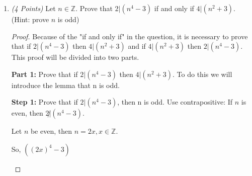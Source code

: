 \documentclass[10pt]{article} %
\newcommand{\Z}{\mathbb{Z}}
\newcommand{\points}[1]{{\it (#1 Points)}}
\begin{document}
\begin{enumerate}
\begin{proof}
\begin{center} {\bf Case 3:}
$ = 9n^2 + 9mn + 9n - 9mn - 9m^2 - 9m + 3n + 3m + 3$

$ = 3(3n^2 + 3n - 3m^2 - 3m + n + m + 1)$

Therefore, 3 divides $(x^2 - y^2)$ in this case.  
\end{center}
\begin{center} {\bf Case 4:} $x = 3n + 2$ and $y = 3m + 2$

Let $3 | (3n + 2)^2 - (3m + 2)^2$

Then, $((3n + 2) + (3m + 2))((3n + 2) - (3m + 2))$

$ = (3n + 3m + 4)(3n - 3m)$

$ = 9n^2 + 9mn + 12n - 9mn - 9m^2 - 12m$

$ = 3(3n^2 + 4n - 3m^2 - 4m)$

Therefore, 3 divides $(x^2 - y^2)$ in this case.  
\end{center}

\begin{center} {\bf Therefore}, it is proven that if $3\not| x$ and $3\not| y$, then $3 | (x^2-y^2)$. \end{center}

\end{proof}

\bigskip

\item \points{4} Let $n\in \Z$.  Prove that $2 | (n^4-3)$ if and only if $4 | (n^2+3)$. (Hint: prove $n$ is odd)

\bigskip


\begin{proof}
Because of the "if and only if" in the question, it is necessary to prove that if $2 | (n^4-3)$ then $4 | (n^2+3)$ and if $4 | (n^2+3)$ then $2 | (n^4-3)$.  This proof will be divided into two parts.  

\begin{raggedright} {\bf Part 1:} Prove that if $2 | (n^4-3)$ then $4 | (n^2+3)$.  To do this we will introduce the lemma that n is odd.
\end{raggedright}

\begin{center} {\bf Step 1:} Prove that if $2 | (n^4-3)$, then n is odd.  Use contrapositive: If $n$ is even, then $2 \not| (n^4-3)$.   \end{center}
\begin{center}
Let $n$ be even, then $n = 2x, x \in \Z$.  

So, $((2x)^4 - 3)$


\end{center}
\end{proof}
\end{enumerate}
\end{document}
